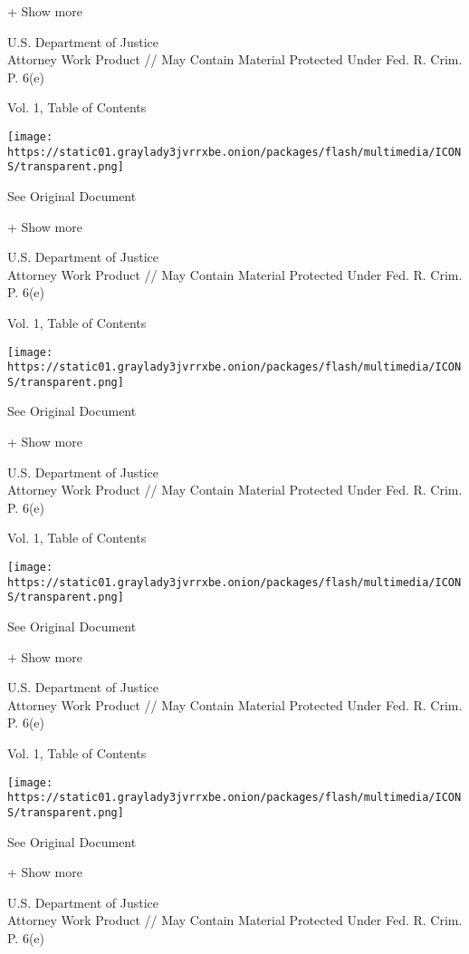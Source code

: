 + Show more

U.S. Department of Justice\\
Attorney Work Product // May Contain Material Protected Under Fed. R.
Crim. P. 6(e)

Vol. 1, Table of Contents

\protect\hyperlink{}{}

\texttt{[image: https://static01.graylady3jvrrxbe.onion/packages/flash/multimedia/ICONS/transparent.png]}

See Original Document

+ Show more

U.S. Department of Justice\\
Attorney Work Product // May Contain Material Protected Under Fed. R.
Crim. P. 6(e)

Vol. 1, Table of Contents

\protect\hyperlink{}{}

\texttt{[image: https://static01.graylady3jvrrxbe.onion/packages/flash/multimedia/ICONS/transparent.png]}

See Original Document

+ Show more

U.S. Department of Justice\\
Attorney Work Product // May Contain Material Protected Under Fed. R.
Crim. P. 6(e)

Vol. 1, Table of Contents

\protect\hyperlink{}{}

\texttt{[image: https://static01.graylady3jvrrxbe.onion/packages/flash/multimedia/ICONS/transparent.png]}

See Original Document

+ Show more

U.S. Department of Justice\\
Attorney Work Product // May Contain Material Protected Under Fed. R.
Crim. P. 6(e)

Vol. 1, Table of Contents

\protect\hyperlink{}{}

\texttt{[image: https://static01.graylady3jvrrxbe.onion/packages/flash/multimedia/ICONS/transparent.png]}

See Original Document

+ Show more

U.S. Department of Justice\\
Attorney Work Product // May Contain Material Protected Under Fed. R.
Crim. P. 6(e)

\protect\hyperlink{}{}

